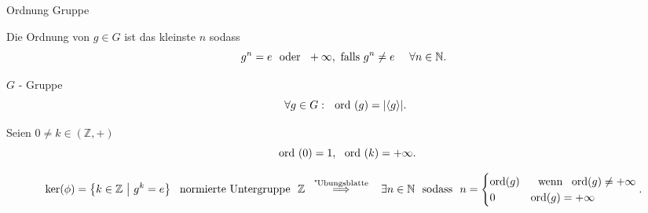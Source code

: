 \documentclass[class=article, crop=false]{standalone}
\begin{document}
\begin{zettel}{Ordnung Gruppe}
\begin{flashcard}[]{}
	\begin{definition}[Ordnung]
		Die Ordnung von $g \in  G$ ist das kleinste $n$ sodass
		\[
			g^n  = e \tx{ oder } +\infty, \text{ falls } g^n  \neq  e \quad \forall n \in  \mathbb{N}
		.\]
	\end{definition}
\end{flashcard}
\begin{theorem}
	$G$ - Gruppe
	\[
		\forall g \in  G : \tx{ ord}(g) = |\langle g \rangle|
	.\]
\end{theorem}
\begin{example}
	Seien $0 \neq k \in  (\mathbb{Z}, +)$
	\[
		\tx{ ord}(0) = 1, \tx{ ord}(k) = + \infty
	.\]
\end{example}

\begin{theorem}
	\[
		\ker (\phi) =  \set{k \in  \mathbb{Z}}{g^k =  e} \tx{ normierte Untergruppe }  \mathbb{Z} \stackrel{\tx{ "Ubungsblatte } }{\implies} \exists n \in  \mathbb{N} \tx{ sodass } n =  \begin{cases}
			\ord(g) & \tx{  wenn } \ord(g) \neq + \infty \\
			0       & \ord(g) =  + \infty                \\
		\end{cases}
	.\]

\end{theorem}
\end{zettel}
\end{document}

